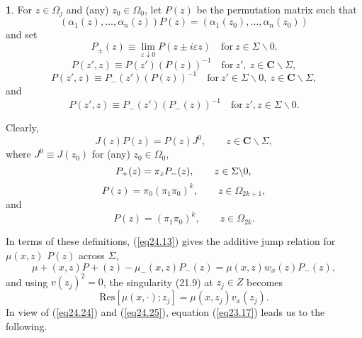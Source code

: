 \documentclass{surv-l}
\theoremstyle{plain}
\theoremstyle{definition}
\newtheorem{definition}[theorem]{\sc{Definition}}
\numberwithin{equation}{chapter}
\begin{document}
\setcounter{theorem}{14}
\begin{definition}\label{defi24.15}
For $z\in\Omega_{j}$ and (any) $z_{0}\in\Omega_{0}$, let $P(z)$ be the permutation matrix such that
\begin{equation*}
(\alpha_{1}(z),\ldots,\alpha_{n}(z))P(z)=(\alpha_{1}(z_{0}),\ldots,\alpha_{n}(z_{0}))
\end{equation*}
and set 
\renewcommand{\theequation}{\thesection.\arabic{equation}}
\setcounter{equation}{15}
\begin{equation}\label{eq24.16}
P_{\pm}(z) \equiv\lim_{\varepsilon\downarrow 0}P(z\pm i\varepsilon z)\quad \mathrm{for}\ z\in\Sigma\backslash 0.
\end{equation}
\setcounter{equation}{16}
\begin{equation}\label{eq24.17}
P(z', z) \equiv P(z')(P(z))^{-1}\quad \mathrm{for}\ z',\  z\in \mathbf{C}\backslash \Sigma,
\end{equation}
\begin{equation}\label{eq24.18}
P(z', z) \equiv P_{-}(z')(P(z))^{-1}\quad \mathrm{for}\ z'\in\Sigma\backslash 0,\  z\in \mathbf{C}\backslash \Sigma,
\end{equation}
and
\begin{equation}\label{eq24.19}
P(z', z)\equiv P_{-}(z')(P_{-}(z))^{-1}\quad \mathrm{for}\ z', z\in\Sigma\backslash 0.
\end{equation}

Clearly,
\begin{equation}\label{eq24.20}
J(z)P(z)=P(z)J^{0},\qquad  z\in \mathbf{C}\backslash \Sigma,
\end{equation}
where $J^{0}\equiv J(z_{0})$ for (any) $z_{0}\in\Omega_{0}$,
\begin{equation}\label{eq24.21}
P_{+}(z)=\pi_{z}P_{-}(z),\qquad z\in\Sigma\backslash 0,\\
\end{equation}
\begin{equation}\label{eq24.22}
P(z)=\pi_{0}(\pi_{1}\pi_{0})^{k},\qquad z\in\Omega_{2k+1},
\end{equation}
and
\begin{equation}\label{eq24.23}
P(z)=(\pi_{1}\pi_{0})^{k},\qquad z\in\Omega_{2k}.
\end{equation}

In terms of these definitions, (\ref{eq24.13}) gives the additive jump relation for $\mu(x, z)$ $P(z)$ across $\Sigma$,
\begin{equation}\label{eq24.24}
\mu+(x, z)P+(z)-\mu_{-}(x, z)P_{-}(z)=\mu(x, z)w_{x}(z)P_{-}(z),
\end{equation}
and using $v(z_{j})^{2}=0$, the singularity (21.9) at $z_{j}\in Z$ becomes
\begin{equation}\label{eq24.25}
\mathrm{Res}[\mu(x, \cdot); z_{j}]=\mu(x, z_{j})v_{x}(z_{j}).
\end{equation}
In view of (\ref{eq24.24}) and (\ref{eq24.25}), equation (\ref{eq23.17}) leads us to the following.
\end{definition}
\end{document}
